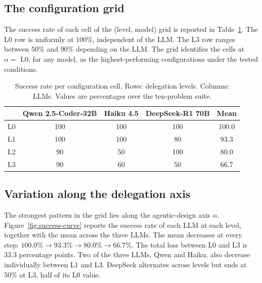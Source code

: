 \documentclass[11pt,a4paper]{article}
\begin{document}
\subsection{The configuration grid}\label{sec:results:grid}
The success rate of each cell of the (level, model) grid is reported in Table~\ref{tab:grid}. The L0 row is uniformly at $100\%$, independent of the LLM. The L3 row ranges between $50\%$ and $90\%$ depending on the LLM. The grid identifies the cells at $\alpha = $ L0, for any model, as the highest-performing configurations under the tested conditions.

\begin{table}[H]
\centering
\caption{Success rate per configuration cell. Rows: delegation levels. Columns: LLMs. Values are percentages over the ten-problem suite.}
\label{tab:grid}
\small
\begin{tabular}{lccc|c}
\toprule
 & \textbf{Qwen 2.5-Coder-32B} & \textbf{Haiku 4.5} & \textbf{DeepSeek-R1 70B} & \textbf{Mean} \\
\midrule
L0 & 100 & 100 & 100 & 100.0 \\
L1 & 100 & 100 & 80  & 93.3 \\
L2 & 90  & 50  & 100 & 80.0 \\
L3 & 90  & 60  & 50  & 66.7 \\
\bottomrule
\end{tabular}
\end{table}

\subsection{Variation along the delegation axis}\label{sec:results:delegation}
The strongest pattern in the grid lies along the agentic-design axis $\alpha$. Figure~\ref{fig:success-curve} reports the success rate of each LLM at each level, together with the mean across the three LLMs. The mean decreases at every step: $100.0\% \to 93.3\% \to 80.0\% \to 66.7\%$. The total loss between L0 and L3 is $33.3$ percentage points. Two of the three LLMs, Qwen and Haiku, also decrease individually between L1 and L3. DeepSeek alternates across levels but ends at $50\%$ at L3, half of its L0 value.
\end{document}
